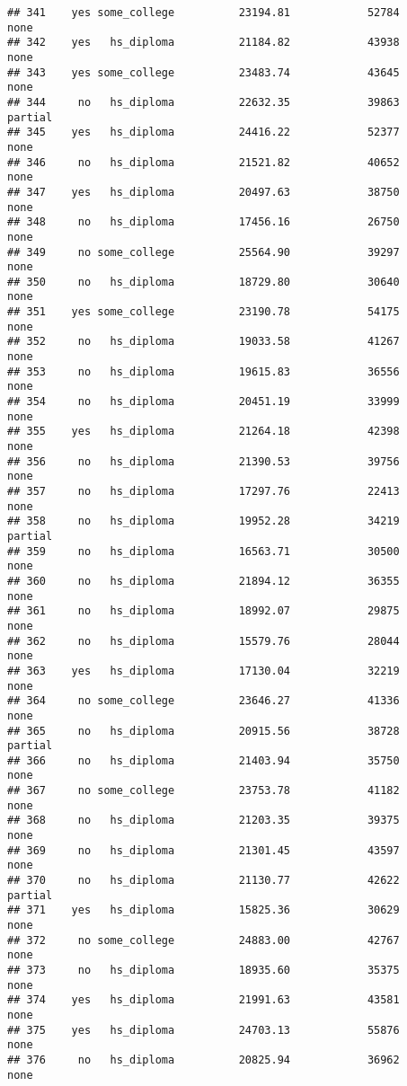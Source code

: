 \documentclass[
]{article}
\begin{document}
\begin{verbatim}
## 341    yes some_college          23194.81            52784        none
## 342    yes   hs_diploma          21184.82            43938        none
## 343    yes some_college          23483.74            43645        none
## 344     no   hs_diploma          22632.35            39863     partial
## 345    yes   hs_diploma          24416.22            52377        none
## 346     no   hs_diploma          21521.82            40652        none
## 347    yes   hs_diploma          20497.63            38750        none
## 348     no   hs_diploma          17456.16            26750        none
## 349     no some_college          25564.90            39297        none
## 350     no   hs_diploma          18729.80            30640        none
## 351    yes some_college          23190.78            54175        none
## 352     no   hs_diploma          19033.58            41267        none
## 353     no   hs_diploma          19615.83            36556        none
## 354     no   hs_diploma          20451.19            33999        none
## 355    yes   hs_diploma          21264.18            42398        none
## 356     no   hs_diploma          21390.53            39756        none
## 357     no   hs_diploma          17297.76            22413        none
## 358     no   hs_diploma          19952.28            34219     partial
## 359     no   hs_diploma          16563.71            30500        none
## 360     no   hs_diploma          21894.12            36355        none
## 361     no   hs_diploma          18992.07            29875        none
## 362     no   hs_diploma          15579.76            28044        none
## 363    yes   hs_diploma          17130.04            32219        none
## 364     no some_college          23646.27            41336        none
## 365     no   hs_diploma          20915.56            38728     partial
## 366     no   hs_diploma          21403.94            35750        none
## 367     no some_college          23753.78            41182        none
## 368     no   hs_diploma          21203.35            39375        none
## 369     no   hs_diploma          21301.45            43597        none
## 370     no   hs_diploma          21130.77            42622     partial
## 371    yes   hs_diploma          15825.36            30629        none
## 372     no some_college          24883.00            42767        none
## 373     no   hs_diploma          18935.60            35375        none
## 374    yes   hs_diploma          21991.63            43581        none
## 375    yes   hs_diploma          24703.13            55876        none
## 376     no   hs_diploma          20825.94            36962        none

\end{verbatim}
\end{document}
